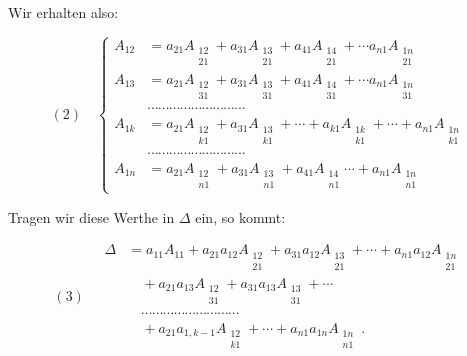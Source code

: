 Wir erhalten also:

\[
(2)\quad
\left\{
\begin{aligned}
A_{12} &= a_{21}A_{\substack{12\\21}} + a_{31}A_{\substack{13\\21}} + a_{41}A_{\substack{14\\21}} + \cdots a_{n1}A_{\substack{1n\\21}}\\
A_{13} &= a_{21}A_{\substack{12\\31}} + a_{31}A_{\substack{13\\31}} + a_{41}A_{\substack{14\\31}} + \cdots a_{n1}A_{\substack{1n\\31}}\\
&\cdots\cdots\cdots\cdots\cdots\cdots\cdots\cdots\cdots\\
A_{1k} &= a_{21}A_{\substack{12\\k1}} + a_{31}A_{\substack{13\\k1}} + \cdots + a_{k1}A_{\substack{1k\\k1}} + \cdots + a_{n1}A_{\substack{1n\\k1}}\\
&\cdots\cdots\cdots\cdots\cdots\cdots\cdots\cdots\cdots\\
A_{1n} &= a_{21}A_{\substack{12\\n1}} + a_{31}A_{\substack{13\\n1}} + a_{41}A_{\substack{14\\n1}} \cdots + a_{n1}A_{\substack{1n\\n1}}
\end{aligned}
\right.
\]


Tragen wir diese Werthe in $\Delta$ ein, so kommt:

\[
(3)\quad
\begin{aligned}
\Delta &= a_{11}A_{11} + a_{21}a_{12}A_{\substack{12\\21}} + a_{31}a_{12}A_{\substack{13\\21}} + \cdots + a_{n1}a_{12}A_{\substack{1n\\21}}\\
&\quad + a_{21}a_{13}A_{\substack{12\\31}} + a_{31}a_{13}A_{\substack{13\\31}} + \cdots\\
&\quad \cdots\cdots\cdots\cdots\cdots\cdots\cdots\cdots\cdots\\
&\quad + a_{21}a_{1,k-1}A_{\substack{12\\k1}} + \cdots + a_{n1}a_{1n}A_{\substack{1n\\n1}}\ .
\end{aligned}
\]

